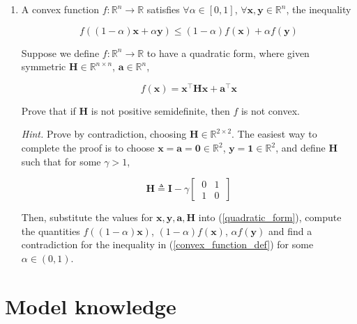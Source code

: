 \documentclass{article}
\numberwithin{equation}{section}
\begin{document}
\begin{enumerate}
    \item
    A convex function $ f : \mathbb{R}^n \rightarrow \mathbb{R} $ satisfies
    $ \forall \alpha \in [0, 1] $, $ \forall \mathbf{x}, \mathbf{y} \in
    \mathbb{R}^n $, the inequality

    \begin{equation} \label{convex_function_def}
        f((1 - \alpha)\mathbf{x} + \alpha\mathbf{y}) \le
        (1 - \alpha)f(\mathbf{x}) + \alpha f(\mathbf{y})
    \end{equation}
    
    Suppose we define $ f : \mathbb{R}^n \rightarrow
    \mathbb{R} $ to have a quadratic form, where given symmetric
    $ \mathbf{H} \in \mathbb{R}^{n \times n} $, $ \mathbf{a} \in \mathbb{R}^n $,

    \begin{equation} \label{quadratic_form}
        f(\mathbf{x}) = \mathbf{x}^\top\mathbf{Hx} + \mathbf{a}^\top\mathbf{x}
    \end{equation}

    Prove that if $ \mathbf{H} $ is not positive semidefinite, then $ f $ is
    not convex.

    \medskip

    \textit{Hint.} Prove by contradiction, choosing $ \mathbf{H} \in
    \mathbb{R}^{2 \times 2} $. The easiest way to complete the proof is to
    choose $ \mathbf{x} = \mathbf{a} = \mathbf{0} \in \mathbb{R}^2 $,
    $ \mathbf{y} = \mathbf{1} \in \mathbb{R}^2 $, and define $ \mathbf{H} $ such
    that for some $ \gamma > 1 $,

    \begin{equation*}
        \mathbf{H} \triangleq \mathbf{I} -
        \gamma\begin{bmatrix} \ 0 & 1 \ \\ \ 1 & 0 \ \end{bmatrix}
    \end{equation*}

    Then, substitute the values for $ \mathbf{x}, \mathbf{y}, \mathbf{a},
    \mathbf{H} $ into (\ref{quadratic_form}), compute the quantities
    $ f((1 - \alpha)\mathbf{x}) $, $ (1 - \alpha)f(\mathbf{x}) $,
    $ \alpha f(\mathbf{y}) $ and find a contradiction for the inequality in
    (\ref{convex_function_def}) for some $ \alpha \in  (0, 1) $.
\end{enumerate}

\section{Model knowledge}
\end{document}
